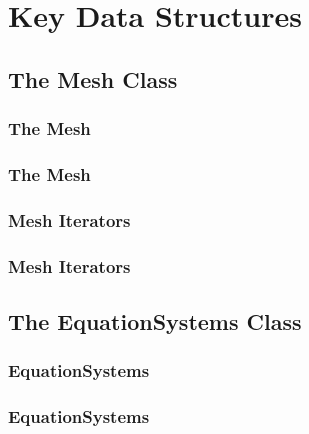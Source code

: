\section{Key Data Structures}

\subsection{The Mesh Class}
\begin{frame}[shrink]
  \frametitle{The Mesh}
  
\end{frame}

\begin{frame}[shrink]
  \frametitle{The Mesh}
  
\end{frame}

\begin{frame}[shrink]
  \frametitle{Mesh Iterators}
  
\end{frame}

\begin{frame}[shrink]
  \frametitle{Mesh Iterators}
  
\end{frame}





\subsection{The EquationSystems Class}
\begin{frame}[shrink]
  \frametitle{EquationSystems}
  
\end{frame}

\begin{frame}[shrink]
  \frametitle{EquationSystems}
  
\end{frame}
